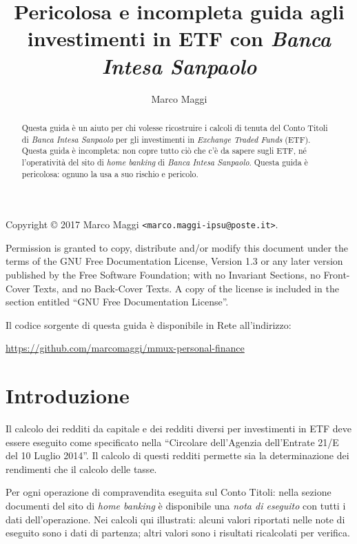 \documentclass[12pt,a4paper]{article}
\author{Marco Maggi}
\title{Pericolosa e incompleta guida agli investimenti in ETF con \emph{Banca Intesa Sanpaolo}}
\begin{document}
\maketitle

\begin{abstract}
  Questa guida è un  aiuto per chi volesse ricostruire i calcoli  di tenuta del Conto
  Titoli  di \emph{Banca  Intesa  Sanpaolo} per  gli  investimenti in  \emph{Exchange
     Traded Funds} (ETF).  Questa guida è incompleta:  non copre tutto ciò che c'è da
  sapere sugli ETF,  né l'operatività del sito di \emph{home  banking} di \emph{Banca
     Intesa Sanpaolo}.   Questa guida  è pericolosa:  ognuno la usa  a suo  rischio e
  pericolo.
\end{abstract}

\tableofcontents

\newpage{}

\noindent
Copyright \copyright{} 2017 Marco Maggi \texttt{<marco.maggi-ipsu@poste.it>}.

Permission is granted to copy, distribute and/or modify this document under the terms
of the GNU Free Documentation License, Version  1.3 or any later version published by
the Free Software  Foundation; with no Invariant Sections, no  Front-Cover Texts, and
no Back-Cover Texts.  A copy of the license is included in the section entitled ``GNU
Free Documentation License''.

Il codice sorgente di questa guida è disponibile in Rete all'indirizzo:
\begin{center}
  \url{https://github.com/marcomaggi/mmux-personal-finance}
\end{center}

\newpage{}

\section{Introduzione}


Il calcolo dei redditi da capitale e dei redditi diversi per investimenti in ETF deve
essere eseguito come specificato nella ``Circolare dell'Agenzia dell'Entrate 21/E del
10 Luglio  2014''.  Il calcolo di  questi redditi permette sia  la determinazione dei
rendimenti che il calcolo delle tasse.

Per  ogni  operazione di  compravendita  eseguita  sul  Conto Titoli:  nella  sezione
documenti del sito  di \emph{home banking} è disponibile una  \emph{nota di eseguito}
con  tutti  i  dati  dell'operazione.   Nei calcoli  qui  illustrati:  alcuni  valori
riportati  nelle note  di eseguito  sono  i dati  di  partenza; altri  valori sono  i
risultati ricalcolati per verifica.
\end{document}
